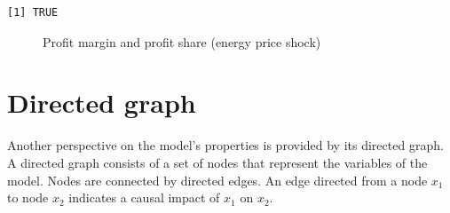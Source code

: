 \documentclass[
  letterpaper,
  DIV=11,
  numbers=noendperiod]{scrreprt}
\begin{document}
\begin{verbatim}
[1] TRUE
\end{verbatim}

\begin{figure}[H]


\caption{\label{fig-energy-prof}Profit margin and profit share (energy
price shock)}

\end{figure}%

\section{Directed graph}\label{directed-graph-7}

Another perspective on the model's properties is provided by its
directed graph. A directed graph consists of a set of nodes that
represent the variables of the model. Nodes are connected by directed
edges. An edge directed from a node \(x_1\) to node \(x_2\) indicates a
causal impact of \(x_1\) on \(x_2\).
\end{document}

